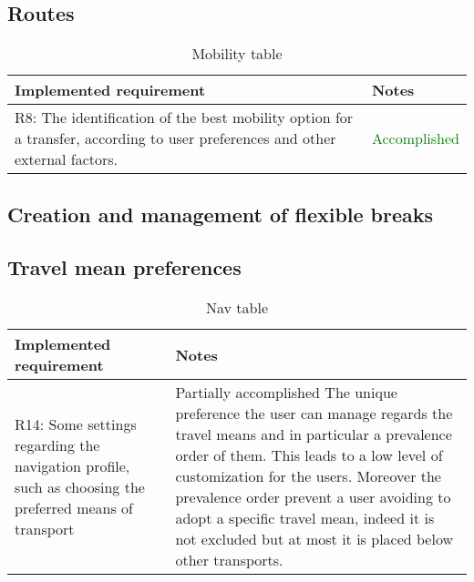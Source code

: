 \subsection{Routes}

\begin{flushleft}
	
	\begin{table}[htp]
		
		\begin{tabular}{p{7cm}|p{7cm}}
			Implemented requirement&Notes\\
			\hline
			\hline
R8: The identification of the best mobility option for a transfer, according to user preferences and other external factors.& \textcolor{green}{  Accomplished} \\
\hline

\end{tabular}

\caption{Mobility table } 
\label{tab:Mobilitytable}

\end{table}

\end{flushleft}



\subsection{Creation and management of flexible breaks}


\clearpage

\subsection{Travel mean preferences}

\begin{flushleft}
	
	\begin{table}[htp]
		
		\begin{tabular}{p{7cm}|p{7cm}}
			Implemented requirement&Notes\\
			\hline
			\hline
R14: Some settings regarding the navigation profile, such as choosing the preferred means of transport&\textcolor{BurntOrange}{Partially accomplished} The unique preference the user can manage regards the travel means and in particular a prevalence order of them. This leads to a low level of customization for the users. Moreover the prevalence order prevent a user avoiding to adopt a specific travel mean, indeed it is not excluded but at most it is placed below other transports.   \\
\hline

\end{tabular}

\caption{Nav table } 
\label{tab:Navtable}

\end{table}

\end{flushleft}